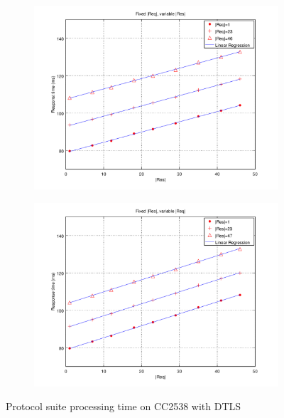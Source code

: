 \begin{figure}[ht!]
	\center
	\begin{subfigure}{0.45\linewidth}
	\center
	\includegraphics[width=\textwidth]{fig/dtlstime_fixed_req.png}
	\end{subfigure}
	\begin{subfigure}{0.45\linewidth}
	\center
	\includegraphics[width=\textwidth]{fig/dtlstime_fixed_res.png}
	\end{subfigure}
	\caption{Protocol suite processing time on CC2538 with DTLS}
	\label{Fig: Protocol suite processing time on CC2538 with DTLS}
\end{figure}

